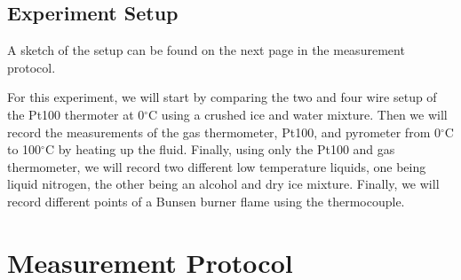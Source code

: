 \documentclass{article}
\begin{document}
\subsection{Experiment Setup}

A sketch of the setup can be found on the next page in the measurement protocol. 

For this experiment, we will start by comparing the two and four wire setup of the Pt100 thermoter at 0$^{\circ}$C using a crushed ice and water mixture. Then we will record the measurements of the gas thermometer, Pt100, and pyrometer from 0$^{\circ}$C to 100$^{\circ}$C by heating up the fluid. Finally, using only the Pt100 and gas thermometer, we will record two different low temperature liquids, one being liquid nitrogen, the other being an alcohol and dry ice mixture. Finally, we will record different points of a Bunsen burner flame using the thermocouple.  

\newpage

\section{Measurement Protocol}
\end{document}
